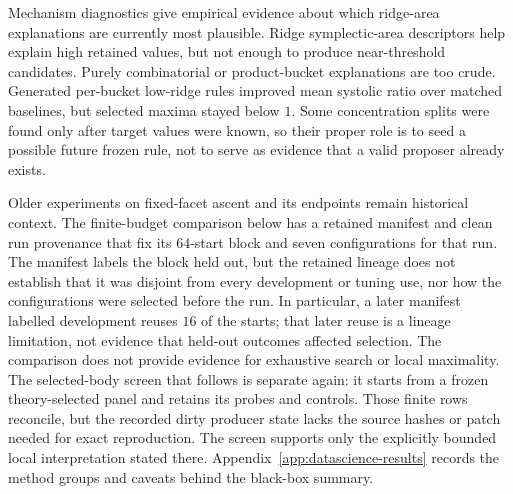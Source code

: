 Mechanism diagnostics give empirical evidence about which ridge-area
explanations are currently most plausible.  Ridge symplectic-area descriptors
help explain high retained values, but not enough to produce near-threshold
candidates.  Purely combinatorial or product-bucket explanations are too crude.
Generated per-bucket low-ridge rules improved mean systolic ratio over matched
baselines, but selected maxima stayed below \(1\).  Some concentration splits
were found only after target values were known, so their proper role is to seed
a possible future frozen rule, not to serve as evidence that a valid proposer
already exists.

Older experiments on fixed-facet ascent and its endpoints remain historical
context.  The finite-budget comparison below has a retained manifest and clean
run provenance that fix its \(64\)-start block and seven configurations for
that run.  The manifest labels the block held out, but the retained lineage
does not establish that it was disjoint from every development or tuning use,
nor how the configurations were selected before the run.  In particular, a
later manifest labelled development reuses \(16\) of the starts; that later
reuse is a lineage limitation, not evidence that held-out outcomes affected
selection.  The comparison does not provide evidence for exhaustive search or
local maximality.  The selected-body screen that follows is separate again: it
starts from a frozen theory-selected panel and retains its probes and controls.
Those finite rows reconcile, but the recorded dirty producer state lacks the
source hashes or patch needed for exact reproduction.  The screen supports only
the explicitly bounded local interpretation stated there.
Appendix~\ref{app:datascience-results} records the method groups and caveats
behind the black-box summary.




